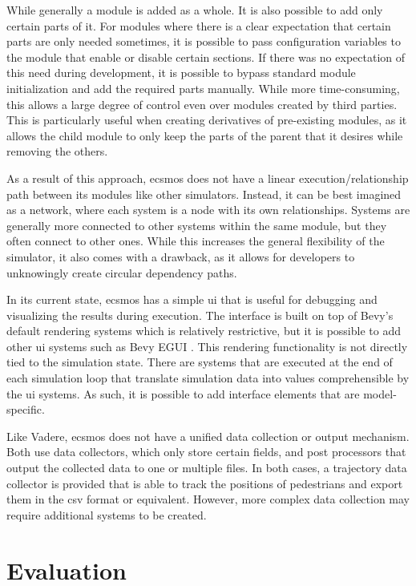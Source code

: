 \documentclass[twoside, 11pt]{article}
\begin{document}
While generally a module is added as a whole. It is also possible to add only certain parts of it. For modules where there is a clear expectation that certain parts are only needed sometimes, it is possible to pass configuration variables to the module that enable or disable certain sections. If there was no expectation of this need during development, it is possible to bypass standard module initialization and add the required parts manually. While more time-consuming, this allows a large degree of control even over modules created by third parties. This is particularly useful when creating derivatives of pre-existing modules, as it allows the child module to only keep the parts of the parent that it desires while removing the others.

As a result of this approach, \gls{ecsmos} does not have a linear execution/relationship path between its modules like other simulators. Instead, it can be best imagined as a network, where each system is a node with its own relationships. Systems are generally more connected to other systems within the same module, but they often connect to other ones. While this increases the general flexibility of the simulator, it also comes with a drawback, as it allows for developers to unknowingly create circular dependency paths.

In its current state, \gls{ecsmos} has a simple \gls{ui} that is useful for debugging and visualizing the results during execution. The interface is built on top of Bevy's default rendering systems which is relatively restrictive, but it is possible to add other \gls{ui} systems such as Bevy EGUI \cite{bevyegui}. This rendering functionality is not directly tied to the simulation state. There are systems that are executed at the end of each simulation loop that translate simulation data into values comprehensible by the \gls{ui} systems. As such, it is possible to add interface elements that are model-specific. 

Like Vadere, \gls{ecsmos} does not have a unified data collection or output mechanism. Both use data collectors, which only store certain fields, and post processors that output the collected data to one or multiple files. In both cases, a trajectory data collector is provided that is able to track the positions of pedestrians and export them in the \gls{csv} format or equivalent. However, more complex data collection may require additional systems to be created.

\section{Evaluation} \label{sec:evaluation}
\end{document}
